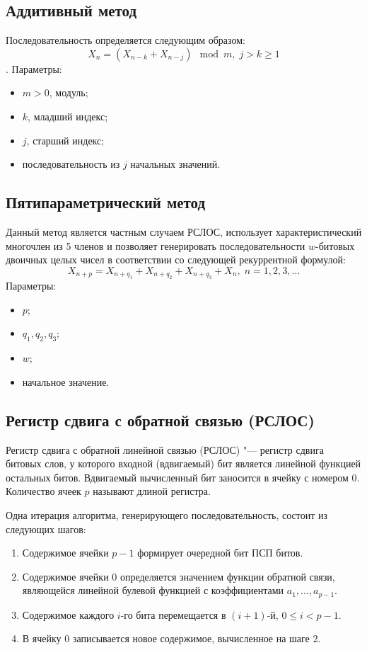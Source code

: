 \documentclass[bachelor, och, pract_otchet]{SCWorks}
\begin{document}
\subsection{Аддитивный метод}
Последовательность определяется следующим образом:
\[ X_n = (X_{n - k} + X_{n - j}) \mod m, \; j > k \geq 1 \].
Параметры:
\begin{itemize}
  \item $m > 0$, модуль;
  \item $k$, младший индекс;
  \item $j$, старший индекс;
  \item последовательность из $j$ начальных значений.
\end{itemize}

\subsection{Пятипараметрический метод}
Данный метод является частным случаем РСЛОС, использует характеристический многочлен из 5 членов и позволяет генерировать последовательности $w$-битовых двоичных целых чисел в соответствии со следующей рекуррентной 
формулой:
\[ X_{n + p} = X_{n + q_1} + X_{n + q_2} + X_{n + q_3} + X_n, \; n = 1, 2, 3, \dots \]
Параметры:
\begin{itemize}
  \item $p$;
  \item $q_1, q_2, q_3$;
  \item $w$;
  \item начальное значение.
\end{itemize}

\subsection{Регистр сдвига с обратной связью (РСЛОС)}
Регистр сдвига с обратной линейной связью (РСЛОС) "--- регистр сдвига битовых слов, у которого входной (вдвигаемый) бит является линейной функцией остальных битов. Вдвигаемый вычисленный бит заносится в 
ячейку с номером 0. Количество ячеек $p$ называют длиной регистра.

Одна итерация алгоритма, генерирующего последовательность, состоит 
из следующих шагов:
\begin{enumerate}
  \item Содержимое ячейки $p - 1$ формирует очередной бит ПСП битов.
  \item Содержимое ячейки 0 определяется значением функции обратной связи, 
  являющейся линейной булевой функцией с коэффициентами $a_1, \dots, a_{p - 1}$.
  \item Содержимое каждого $i$-го бита перемещается в $(i + 1)$-й, $0 \leq i < p - 1$. 
  \item В ячейку 0 записывается новое содержимое, вычисленное на шаге 2.
\end{enumerate}
\end{document}
